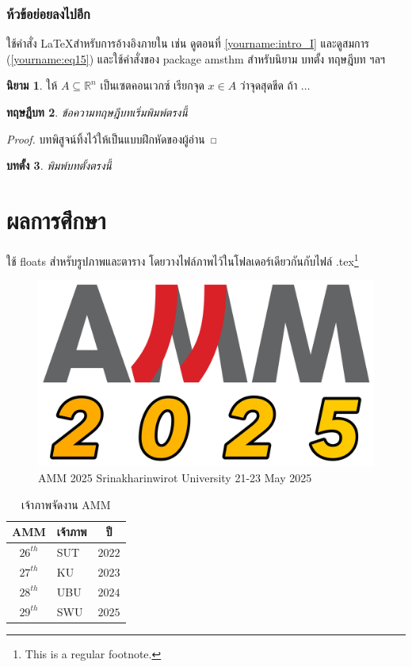 \documentclass[12pt, a4paper, twoside]{article}
\theoremstyle{plain}
\newtheorem{theorem}{ทฤษฎีบท}[section]
\newtheorem{lemma}[theorem]{บทตั้ง}
\theoremstyle{definition}
\newtheorem{definition}[theorem]{นิยาม}
\theoremstyle{remark}
\numberwithin{equation}{section}
\begin{document}
\subsubsection{ห้วข้อย่อยลงไปอีก}
ใช้คำสั่ง \LaTeX สำหรับการอ้างอิงภายใน เช่น ดูตอนที่ \ref{yourname:intro_I} และดูสมการ (\ref{yourname:eq15}) และใช้คำสั่งของ package amsthm สำหรับนิยาม บทตั้ง ทฤษฎีบท ฯลฯ  

\begin{definition}
ให้ $A \subseteq \mathbb{R}^n$ เป็นเซตคอนเวกซ์  เรียกจุด $x \in A$ ว่าจุดสุดขีด ถ้า $\dots$
\end{definition}

\begin{theorem}
	ข้อความทฤษฎีบทเริ่มพิมพ์ตรงนี้
\end{theorem}
\begin{proof}
   บทพิสูจน์ทิ้งไว้ให้เป็นแบบฝึกหัดของผู้อ่าน
\end{proof}

\begin{lemma}
	พิมพ์บทตั้งตรงนี้
\end{lemma}

\section{ผลการศึกษา}
ใช้ floats สำหรับรูปภาพและตาราง โดยวางไฟล์ภาพไว้ในโฟลเดอร์เดียวกันกับไฟล์ .tex\footnote{This is a regular footnote.}
     
\begin{figure}[h]
\centering
\includegraphics[scale=0.1]{amm2025_logo_small_color.png}
\caption{AMM 2025 Srinakharinwirot University 21-23 May 2025}
\label{yourname:ammlogo}
\end{figure}

\begin{table}[h]
\caption{เจ้าภาพจัดงาน AMM}
\begin{center}
\begin{tabular}{clc}  \hline
 AMM & เจ้าภาพ & ปี\\ \hline\hline
 $26^{th}$ & SUT &$2022$ \\ 
$27^{th}$ & KU  &$2023$ \\ 
$28^{th}$ & UBU &$2024$ \\ 
$29^{th}$ & SWU &$2025$ \\ 	 
\hline
\end{tabular}
\label{yourname:tableofamm}
\end{center}
\end{table}
\end{document}
